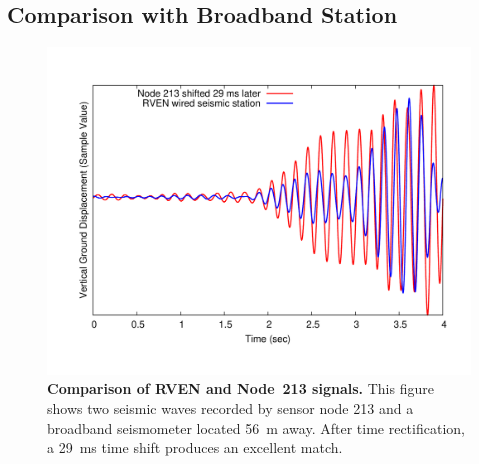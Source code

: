 \subsection{Comparison with Broadband Station}
\label{evaluation-sec-datagroundtruthing}

\begin{figure}[t]
\label{evaluation-fig-rvenv213}
\begin{center}
\includegraphics[width=\hsize]{./5-evaluation/figs/timing/RV213/2005-08-15_09.11.28/213VREFTEK-NEGATIVE29MS-OFFSET.pdf}
\end{center}
\caption{\textbf{Comparison of RVEN and Node~213 signals.} 
This figure shows two seismic waves recorded by sensor node 213 and a
broadband seismometer located 56~m away. After time rectification, a 29~ms
time shift produces an excellent match.}
\end{figure}


